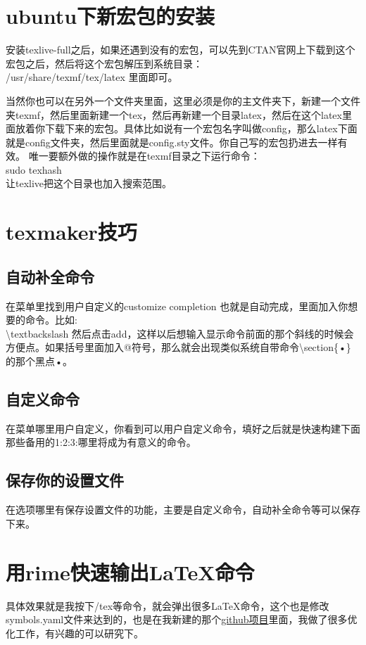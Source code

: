 \documentclass[11pt,oneside]{book}
\begin{document}
\begin{common-format}
\section{ubuntu下新宏包的安装}
安装texlive-full之后，如果还遇到没有的宏包，可以先到CTAN官网上下载到这个宏包之后，然后将这个宏包解压到系统目录：\\
/usr/share/texmf/tex/latex 里面即可。

当然你也可以在另外一个文件夹里面，这里必须是你的主文件夹下，新建一个文件夹texmf，然后里面新建一个tex，然后再新建一个目录latex，然后在这个latex里面放着你下载下来的宏包。具体比如说有一个宏包名字叫做config，那么latex下面就是config文件夹，然后里面就是config.sty文件。你自己写的宏包扔进去一样有效。
唯一要额外做的操作就是在texmf目录之下运行命令：\\
sudo texhash  \\
让texlive把这个目录也加入搜索范围。


\section{texmaker技巧}
\subsection{自动补全命令}
在菜单里找到用户自定义的customize completion 也就是自动完成，里面加入你想要的命令。比如:\\
\textbackslash textbackslash 然后点击add，这样以后想输入显示命令前面的那个斜线的时候会方便点。如果括号里面加入@符号，那么就会出现类似系统自带命令\textbackslash section\{•\}的那个黑点•。

\subsection{自定义命令}
在菜单哪里用户自定义，你看到可以用户自定义命令，填好之后就是快速构建下面那些备用的1:2:3:哪里将成为有意义的命令。

\subsection{保存你的设置文件}
在选项哪里有保存设置文件的功能，主要是自定义命令，自动补全命令等可以保存下来。

\section{用rime快速输出\LaTeX 命令}
具体效果就是我按下/tex等命令，就会弹出很多\LaTeX 命令，这个也是修改symbols.yaml文件来达到的，也是在我新建的那个\href{https://github.com/a358003542/rime-symbols-yaml}{github项目}里面，我做了很多优化工作，有兴趣的可以研究下。



\end{common-format}
\end{document}
